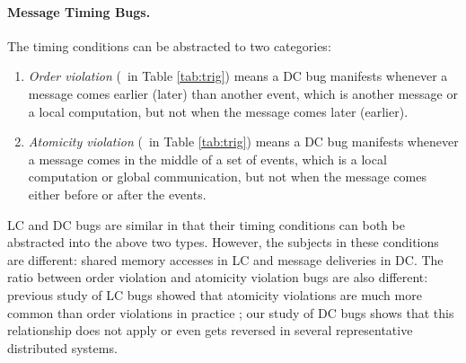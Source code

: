 \paragraph{Message Timing Bugs.}

The timing conditions can be abstracted to two categories:


\begin{enumerate}[label=\alph*.]

\item 
{\em Order violation} (\pctTrigOrder\ in Table \ref{tab:trig}) means 
a DC bug manifests
whenever a message comes earlier (later) than another event, which is
another message or a local computation, but not when the message comes
later (earlier).

\item
{\em Atomicity violation} (\pctTrigAtom\ in Table \ref{tab:trig}) 
means a DC bug manifests
whenever a message comes in the middle of a set of events, which is a
local computation or global communication, but not when the message
comes either before or after the events.

\end{enumerate}
%
LC and DC bugs are similar in that their timing conditions can both be
abstracted into the above two types. However, the subjects in these
conditions are different: shared memory accesses in LC and message
deliveries in DC. The ratio between order violation and atomicity
violation bugs are also different:
previous study of LC bugs showed that
atomicity violations are much more common than order violations in practice
%
\cite{Lu+08-ConcurrencyBugStudy}; 
our study of DC bugs 
shows that this relationship does not apply or even gets reversed
in several representative distributed systems.
%
%
%




\fi



